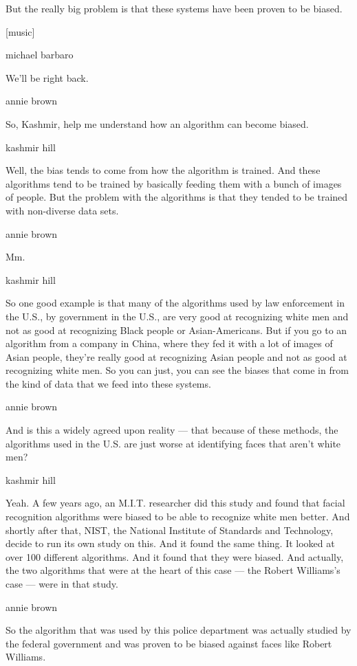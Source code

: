 But the really big problem is that these systems have been proven to be
biased.

{[}music{]}

michael barbaro

We'll be right back.

annie brown

So, Kashmir, help me understand how an algorithm can become biased.

kashmir hill

Well, the bias tends to come from how the algorithm is trained. And
these algorithms tend to be trained by basically feeding them with a
bunch of images of people. But the problem with the algorithms is that
they tended to be trained with non-diverse data sets.

annie brown

Mm.

kashmir hill

So one good example is that many of the algorithms used by law
enforcement in the U.S., by government in the U.S., are very good at
recognizing white men and not as good at recognizing Black people or
Asian-Americans. But if you go to an algorithm from a company in China,
where they fed it with a lot of images of Asian people, they're really
good at recognizing Asian people and not as good at recognizing white
men. So you can just, you can see the biases that come in from the kind
of data that we feed into these systems.

annie brown

And is this a widely agreed upon reality --- that because of these
methods, the algorithms used in the U.S. are just worse at identifying
faces that aren't white men?

kashmir hill

Yeah. A few years ago, an M.I.T. researcher did this study and found
that facial recognition algorithms were biased to be able to recognize
white men better. And shortly after that, NIST, the National Institute
of Standards and Technology, decide to run its own study on this. And it
found the same thing. It looked at over 100 different algorithms. And it
found that they were biased. And actually, the two algorithms that were
at the heart of this case --- the Robert Williams's case --- were in
that study.

annie brown

So the algorithm that was used by this police department was actually
studied by the federal government and was proven to be biased against
faces like Robert Williams.

